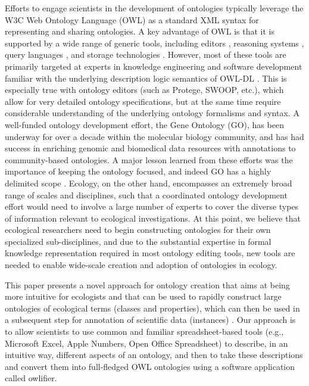 \documentclass[5p,authoryear]{elsarticle}
\newcommand{\owlifier}{\textsf{owlifier}}
\begin{document}
Efforts to engage scientists in the development of ontologies typically leverage the W3C Web Ontology Language (OWL) \citep{smith04:_owl_web_ontol_languag_guide} as a standard XML syntax for representing and sharing ontologies. A key advantage of OWL is that it is supported by a wide range of generic tools, including editors \citep{knublauch04:_editin_descr_logic_ontol_with,kalyanpur05:_swoop}, reasoning systems \citep{sirin07:_pellet,tsarkov06:_fact_descr_logic_reason}, query languages \citep{prudhommeaux08:_sparq_query_languag_for_rdf,motik05:_query_answer_for_owl_dl_with_rules}, and storage technologies \citep{carroll04:_jena,broekstra02:_sesam}. However, most of these tools are primarily targeted at experts in knowledge engineering and software development familiar with the underlying description logic semantics of OWL-DL \citep{grau08:_owl}. This is especially true with ontology editors (such as Protege, SWOOP, etc.), which allow for very detailed ontology specifications, but at the same time require considerable understanding of the underlying ontology formalisms and syntax.  A well-funded ontology development effort, the Gene Ontology (GO), has been underway for over a decade within the molecular biology community, and has had success in enriching genomic and biomedical data resources with annotations to community-based ontologies. A major lesson learned from these efforts was the importance of keeping the ontology focused, and indeed GO has a highly delimited scope \citep{bada04:_short_study_succes_of_gene_ontol}. Ecology, on the other hand, encompasses an extremely broad range of scales and disciplines, such that a coordinated ontology development effort would need to involve a large number of experts to cover the diverse types of information relevant to ecological investigations.  At this point, we believe that ecological researchers need to begin constructing ontologies for their own specialized sub-disciplines, and due to the substantial expertise in formal knowledge representation required in most ontology editing tools, new tools are needed to enable wide-scale creation and adoption of ontologies in ecology.

This paper presents a novel approach for ontology creation that aims at being more intuitive for ecologists and that can be used to rapidly construct large ontologies of ecological terms (classes and properties), which can then be used in a subsequent step for annotation of scientific data (instances) \citep{bowers08:_concep_model_framew_for_expres,berkley09:_improv_data_discov_metad_repos_seman_searc}.  Our approach is to allow scientists to use common and familiar spreadsheet-based tools (e.g., Microsoft Excel, Apple Numbers, Open Office Spreadsheet) to describe, in an intuitive way, different aspects of an ontology, and then to take these descriptions and convert them into full-fledged OWL ontologies using a software application called \owlifier.
\end{document}
